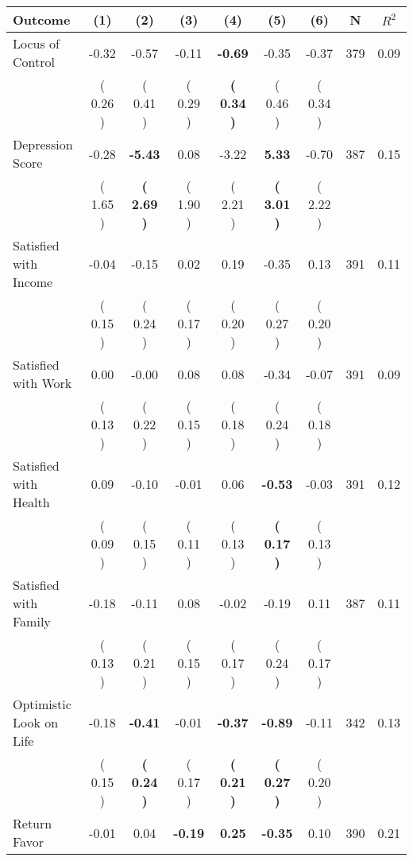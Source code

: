 \begin{tabular}{lcccccccc}
\toprule
 \textbf{Outcome} & \textbf{(1)} & \textbf{(2)} & \textbf{(3)} & \textbf{(4)} & \textbf{(5)} & \textbf{(6)} & \textbf{N} & \textbf{$ R^2$} \\
\midrule
Locus of Control &     -0.32 &     -0.57 &     -0.11 & \textbf{    -0.69} &     -0.35 &     -0.37 & 379 &       0.09 \\ 
 & (     0.26 ) & (     0.41 ) & (     0.29 ) & \textbf{(     0.34 )} & (     0.46 ) & (     0.34 ) & \\
Depression Score &     -0.28 & \textbf{    -5.43} &      0.08 &     -3.22 & \textbf{     5.33} &     -0.70 & 387 &       0.15 \\ 
 & (     1.65 ) & \textbf{(     2.69 )} & (     1.90 ) & (     2.21 ) & \textbf{(     3.01 )} & (     2.22 ) & \\
Satisfied with Income &     -0.04 &     -0.15 &      0.02 &      0.19 &     -0.35 &      0.13 & 391 &       0.11 \\ 
 & (     0.15 ) & (     0.24 ) & (     0.17 ) & (     0.20 ) & (     0.27 ) & (     0.20 ) & \\
Satisfied with Work &      0.00 &     -0.00 &      0.08 &      0.08 &     -0.34 &     -0.07 & 391 &       0.09 \\ 
 & (     0.13 ) & (     0.22 ) & (     0.15 ) & (     0.18 ) & (     0.24 ) & (     0.18 ) & \\
Satisfied with Health &      0.09 &     -0.10 &     -0.01 &      0.06 & \textbf{    -0.53} &     -0.03 & 391 &       0.12 \\ 
 & (     0.09 ) & (     0.15 ) & (     0.11 ) & (     0.13 ) & \textbf{(     0.17 )} & (     0.13 ) & \\
Satisfied with Family &     -0.18 &     -0.11 &      0.08 &     -0.02 &     -0.19 &      0.11 & 387 &       0.11 \\ 
 & (     0.13 ) & (     0.21 ) & (     0.15 ) & (     0.17 ) & (     0.24 ) & (     0.17 ) & \\
Optimistic Look on Life &     -0.18 & \textbf{    -0.41} &     -0.01 & \textbf{    -0.37} & \textbf{    -0.89} &     -0.11 & 342 &       0.13 \\ 
 & (     0.15 ) & \textbf{(     0.24 )} & (     0.17 ) & \textbf{(     0.21 )} & \textbf{(     0.27 )} & (     0.20 ) & \\
Return Favor &     -0.01 &      0.04 & \textbf{    -0.19} & \textbf{     0.25} & \textbf{    -0.35} &      0.10 & 390 &       0.21 \\ 

\end{tabular}
